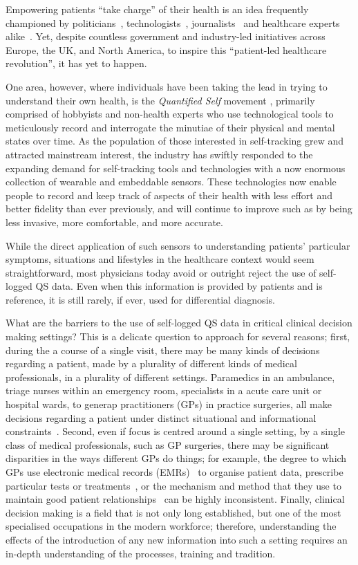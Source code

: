 \documentclass{sigchi}
\begin{document}
Empowering patients ``take charge'' of their health is an idea frequently championed by politicians~\cite{brown, obama}, technologists~\cite{ihealth}, journalists~\cite{goetz} and healthcare experts alike~\cite{swan2012health}.  Yet, despite countless government and industry-led initiatives across Europe, the UK, and North America, to inspire this ``patient-led healthcare revolution'', it has yet to happen.  

One area, however, where individuals have been taking the lead in trying to understand their own health, is the \emph{Quantified Self} movement \cite{}, primarily comprised of hobbyists and non-health experts who use technological tools to meticulously record and interrogate the minutiae of their physical and mental states over time.   As the population of those interested in self-tracking grew and attracted mainstream interest, the industry has swiftly responded to the expanding demand for self-tracking tools and technologies with a now enormous collection of wearable and embeddable sensors.  These technologies now enable people to record and keep track of aspects of their health with less effort and better fidelity than ever previously, and will continue to improve such as by being less invasive, more comfortable, and more accurate.

While the direct application of such sensors to understanding patients' particular symptoms, situations and lifestyles in the healthcare context would seem straightforward, most physicians today avoid or outright reject the use of self-logged QS data. Even when this information is provided by patients and is reference, it is still rarely, if ever, used for differential diagnosis.  

What are the barriers to the use of self-logged QS data in critical clinical decision making settings?  This is a delicate question to approach for several reasons; first, during the a course of a single visit, there may be many kinds of decisions regarding a patient, made by a plurality of different kinds of medical professionals, in a plurality of different settings.   Paramedics in an ambulance, triage nurses within an emergency room, specialists in a acute care unit or hospital wards, to generap practitioners (GPs) in practice surgeries, all make decisions regarding a patient under distinct situational and informational constraints~\cite{croskerry}. Second, even if focus is centred around a single setting, by a single class of medical professionals, such as GP surgeries, there may be significant disparities in the ways different GPs do things; for example, the degree to which GPs use electronic medical records (EMRs)~\cite{hunt} to organise patient data, prescribe particular tests or treatments~\cite{}, or the mechanism and method that they use to maintain good patient relationships~\cite{} can be highly inconsistent. Finally, clinical decision making is a field that is not only long established, but one of the most specialised occupations in the modern workforce; therefore, understanding the effects of the introduction of any new information into such a setting requires an in-depth understanding of the processes, training and tradition.
\end{document}
